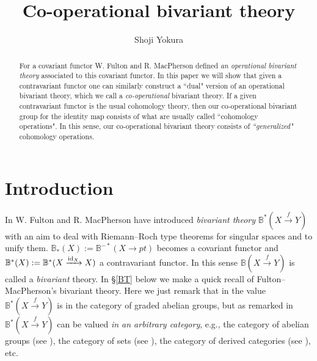 \documentclass[a4paper]{amsart}
\begin{document}
\title{Co-operational bivariant theory%
}

\author{Shoji Yokura}

\date{}
\address{Graduate School of Science and Engineering, Kagoshima University, 1-21-35 Korimoto, Kagoshima, 890-0065, Japan}

\begin{abstract}
For a covariant functor %
W. Fulton and R. MacPherson defined \emph{an operational bivariant theory} associated to this covariant functor. In this paper we will show that given a contravariant functor %
one can similarly construct a ``dual" version of an operational bivariant theory, which we call a \emph{co-operational} bivariant theory. %
If a given contravariant functor is the usual cohomology theory, then our co-operational bivariant group %
for the identity map consists of what are usually called ``cohomology operations". In this sense, our co-operational bivariant theory consists of \emph{``generalized"} cohomology operations.
\end{abstract}

\maketitle


\section{Introduction}
In \cite{FM} W. Fulton and R. MacPherson have introduced \emph{bivariant theory} $\mathbb B^*(X \xrightarrow f Y)$  with an aim to deal with Riemann--Roch type theorems for singular spaces and to unify them. $\mathbb B_*(X):= \mathbb B^{-*}(X \xrightarrow {} pt)$ becomes a covariant functor and $\mathbb B^*(X):= \mathbb B^{*}(X \xrightarrow {\operatorname{id}_X} X)$ %
 a contravariant functor. In this sense  $\mathbb B(X \xrightarrow f Y)$ is called a \emph{bivariant} theory. 
In \S \ref{BT} below we make a quick recall of Fulton--MacPherson's bivariant theory. Here we just remark that in \cite[\S 2.2 Axioms for a bivariant theory]{FM} the value $\mathbb B^*(X \xrightarrow f Y)$ is in the category of graded abelian groups, but as remarked in \cite[Remark, p.22]{FM} $\mathbb B^*(X \xrightarrow f Y)$ can be valued \emph{in an arbitrary category}, e.g., the category of abelian groups (see \cite[\S 6.1.2 Definition of $\mathbb F$, p.60]{FM}), the category of sets (see \cite[\S 4.3 Differentiable Riemann--Roch]{FM}), the category of derived categories (see \cite[\S 7 Grothendieck Duality and Derived Functors]{FM}), etc.
 
\end{document}
